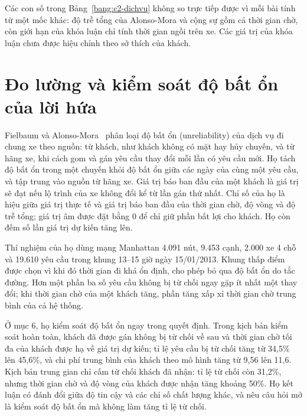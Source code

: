 Các con số trong Bảng~\ref{bang:c2-dichvu} không so trực tiếp được vì mỗi bài tính từ một mốc khác: độ trễ tổng của
Alonso-Mora và cộng sự gồm cả thời gian chờ, còn giới hạn của khóa luận chỉ tính thời gian ngồi trên xe. Các giá trị
của khóa luận chưa được hiệu chỉnh theo sở thích của khách.

\section{Đo lường và kiểm soát độ bất ổn của lời hứa}
\label{muc:c2-dolech}

Fielbaum và Alonso-Mora~\cite{fielbaum2020} phân loại độ bất ổn (unreliability) của dịch vụ đi chung xe theo nguồn:
từ khách, như khách không có mặt hay hủy chuyến, và từ hãng xe, khi cách gom và gán yêu cầu thay đổi mỗi lần có yêu
cầu mới. Họ tách độ bất ổn trong một chuyến khỏi độ bất ổn giữa các ngày của cùng một yêu cầu, và tập trung vào nguồn
từ hãng xe. Giá trị báo ban đầu của một khách là giá trị sẽ đạt nếu lộ trình của xe không đổi kể từ lần gán thứ nhất.
Chỉ số của họ là hiệu giữa giá trị thực tế và giá trị báo ban đầu của thời gian chờ, độ vòng và độ trễ tổng; giá trị
âm được đặt bằng 0 để chỉ giữ phần bất lợi cho khách. Họ còn đếm số lần giá trị dự kiến tăng lên.

Thí nghiệm của họ dùng mạng Manhattan 4.091 nút, 9.453 cạnh, 2.000 xe 4 chỗ và 19.610 yêu cầu trong khung 13--15 giờ
ngày 15/01/2013. Khung thấp điểm được chọn vì khi đó thời gian đi khá ổn định, cho phép bỏ qua độ bất ổn do tắc
đường. Hơn một phần ba số yêu cầu không bị từ chối ngay gặp ít nhất một thay đổi; khi thời gian chờ của một khách
tăng, phần tăng xấp xỉ thời gian chờ trung bình của cả hệ thống.

Ở mục 6, họ kiểm soát độ bất ổn ngay trong quyết định. Trong kịch bản kiểm soát hoàn toàn, khách đã được gán không bị
từ chối về sau và thời gian chờ tối đa của khách được hạ về giá trị dự kiến; tỉ lệ yêu cầu bị từ chối tăng từ 34,5\%
lên 45,6\%, và chi phí trung bình của khách theo mô hình tăng từ 9,56 lên 11,6. Kịch bản trung gian chỉ cấm từ chối
khách đã nhận: tỉ lệ từ chối còn 31,2\%, nhưng thời gian chờ và độ vòng của khách được nhận tăng khoảng 50\%. Họ kết
luận có đánh đổi giữa độ tin cậy và các chỉ số chất lượng khác, và nêu câu hỏi mở là kiểm soát độ bất ổn mà không làm
tăng tỉ lệ từ chối.

